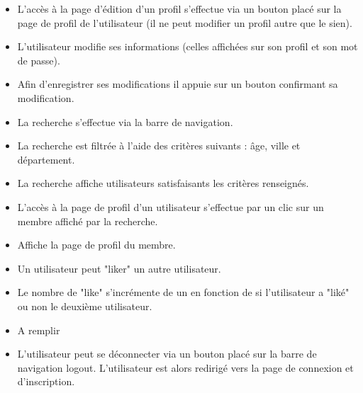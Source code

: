 \begin{itemize}
 \item L'accès à la page d'édition d'un profil s'effectue via un bouton placé sur la page de profil de l'utilisateur (il ne peut modifier un profil autre que le sien).
 \item L'utilisateur modifie ses informations (celles affichées sur son profil et son mot de passe).
 \item Afin d'enregistrer ses modifications il appuie sur un bouton confirmant sa modification.
\end{itemize}


\begin{itemize}
 \item La recherche s'effectue via la barre de navigation.
 \item La recherche est filtrée à l'aide des critères suivants : âge, ville et département.
 \item La recherche affiche utilisateurs satisfaisants les critères renseignés.
\end{itemize}

\begin{itemize}
 \item L'accès à la page de profil d'un utilisateur s'effectue par un clic sur un membre affiché par la recherche.
 \item Affiche la page de profil du membre.
\end{itemize}

\begin{itemize}
 \item Un utilisateur peut "liker" un autre utilisateur.
 \item Le nombre de "like" s'incrémente de un en fonction de si l'utilisateur a "liké" ou non le deuxième utilisateur.
\end{itemize}


\begin{itemize}
\item A remplir
\end{itemize}

\begin{itemize}
 \item L'utilisateur peut se déconnecter via un bouton placé sur la barre de navigation logout. L'utilisateur est alors redirigé vers la page de connexion et d'inscription.
\end{itemize}
